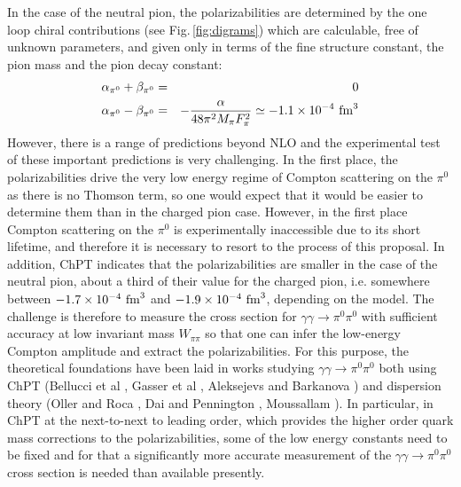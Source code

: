 In the case of the neutral pion, the polarizabilities are determined
by the one loop chiral contributions (see Fig.\,\ref{fig:digrams})
which are calculable, free of unknown parameters, and given only in
terms of the fine structure constant, the pion mass and the pion decay
constant:
\begin{eqnarray}
\alpha_{\pi^0}+\beta_{\pi^0}&=&0\nonumber\\
\alpha_{\pi^0}-\beta_{\pi^0}&=&-\frac{\alpha}{48 \pi^2 M_\pi F_\pi^2}\simeq -1.1\times 10^{-4}~{\rm fm}^3
\end{eqnarray}
However, there is a range of predictions beyond
NLO and the experimental test of these important predictions is very
challenging. In the first place, the polarizabilities drive the very
low energy regime of Compton scattering on the $\pi^0$ as there is no
Thomson term, so one would expect that it would be easier to determine
them than in the charged pion case.  However, in the first place
Compton scattering on the $\pi^0$ is experimentally inaccessible due
to its short lifetime, and therefore it is necessary to resort to the
process of this proposal. In addition, ChPT indicates that the
polarizabilities are smaller in the case of the neutral pion, about a
third of their value for the charged pion, i.e. somewhere between
$-1.7\times 10^{-4}~{\rm fm}^3$ and $-1.9\times 10^{-4}~{\rm fm}^3$,
depending on the model. The challenge is therefore to measure the
cross section for $\gamma\gamma \to \pi^0\pi^0$ with sufficient
accuracy at low invariant mass $W_{\pi\pi}$ so that one can infer the
low-energy Compton amplitude and extract the polarizabilities. For
this purpose, the theoretical foundations have been laid in works
studying $\gamma\gamma\to \pi^0\pi^0$ both using ChPT (Bellucci et al
\cite{Bellucci:1994hx,Bellucci:1994eb}, Gasser et al
\cite{Gasser:2005ud}, Aleksejevs and Barkanova
\cite{Aleksejevs:2014eea}) and dispersion theory (Oller and Roca
\cite{Oller:2008kf}, Dai and Pennington
\cite{Dai:2014zta,Dai:2014lza}, Moussallam
\cite{Moussallam:2013una}). In particular, in ChPT at the next-to-next
to leading order, which provides the higher order quark mass
corrections to the polarizabilities, some of the low energy constants
need to be fixed and for that a significantly more accurate
measurement of the $\gamma\gamma\to \pi^0\pi^0$ cross section is
needed than available presently.

